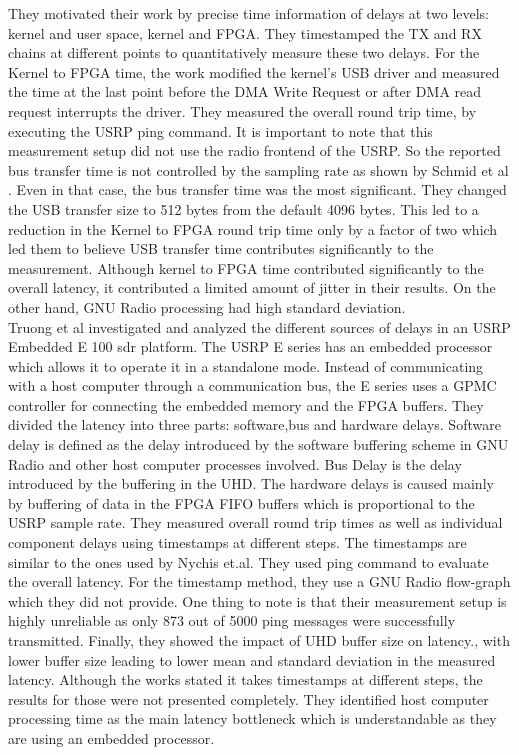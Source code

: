 They motivated their work by precise time information of delays at two levels: kernel and user space, kernel and FPGA.
They timestamped the TX and RX chains at different points to quantitatively measure these two delays.
For the Kernel to FPGA time, the work modified the kernel's USB driver and measured the time at the last point before the DMA Write Request or after DMA read request interrupts the driver.
They measured the overall round trip time, by executing the USRP ping command.
It is important to note that this measurement setup did not use the radio frontend of the USRP.
So the reported bus transfer time is not controlled by the sampling rate as shown by Schmid et al \cite{schmid_experimental_2007}.
Even in that case, the bus transfer time was the most significant.
They changed the USB transfer size to 512 bytes from the default 4096 bytes.
This led to a reduction in the Kernel to FPGA round trip time only by a factor of two which led them to believe USB transfer time contributes significantly to the measurement.
Although kernel to FPGA time contributed significantly to the overall latency, it contributed a limited amount of jitter in their results.
On the other hand, GNU Radio processing had high standard deviation.\\

Truong et al \cite{truong_investigating_2013} investigated and analyzed the different sources of delays in an USRP Embedded E 100 \ac{sdr} platform.
The USRP E series has an embedded processor which allows it to operate it in a standalone mode.
Instead of communicating with a host computer through a communication bus, the E series uses a  \ac{GPMC} controller for connecting the embedded memory and the \ac{FPGA} buffers.
They divided the latency into three parts: software,bus and hardware delays.
Software delay is defined as the delay introduced by the software buffering scheme in GNU Radio and other host computer processes involved.
Bus Delay is the delay introduced by the buffering in the \ac{UHD}.
The hardware delays is caused mainly by buffering of data in the FPGA \ac{FIFO} buffers which is proportional to the USRP sample rate.
They measured overall round trip times as well as individual component delays using timestamps at different steps.
The timestamps are similar to the ones used by Nychis et.al.
They used ping command to evaluate the overall latency.
For the timestamp method, they use a GNU Radio flow-graph which they did not provide.
One thing to note is that their measurement setup is highly unreliable as only 873 out of 5000 ping messages were successfully transmitted.   
Finally, they showed the impact of UHD buffer size on latency., with lower buffer size leading to lower mean and standard deviation in the measured latency.
Although the works stated it takes timestamps at different steps, the results for those were not presented completely.
They identified host computer processing time as the main latency bottleneck which is understandable as they are using an embedded processor. \\




